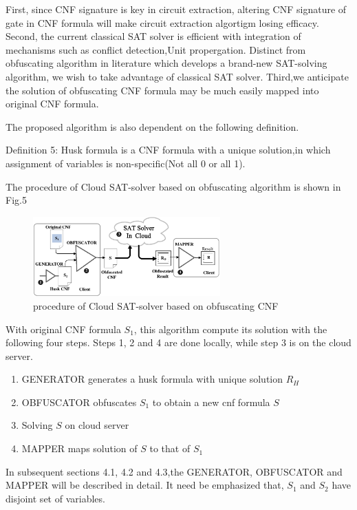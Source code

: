 \documentclass[runningheads,a4paper]{llncs}
\begin{document}
First, since CNF signature is key in circuit extraction, altering CNF signature of gate in CNF formula will make circuit extraction algortigm losing efficacy.
Second, the current classical SAT solver \cite{t10} is efficient with integration of mechanisms such as conflict detection,Unit propergation.
Distinct from obfuscating algorithm in literature\cite{t11} which develops a brand-new SAT-solving algorithm, we wish to take advantage of classical SAT solver.
Third,we anticipate the solution of obfuscating CNF formula may be much easily mapped into original CNF formula.

The proposed algorithm is also dependent on the following definition.

\noindent Definition 5: Husk formula is a CNF formula with a unique solution,in which assignment of variables is non-specific(Not all 0 or all 1).

The procedure of Cloud SAT-solver based on obfuscating algorithm is shown in Fig.5
\begin{figure}
\centering
\includegraphics[width=7.2cm]{a5}
\caption{procedure of Cloud SAT-solver based on obfuscating CNF}
\end{figure}

With original CNF formula $S_1$, 
this algorithm compute its solution with the following four steps. 
Steps 1, 2 and 4 are done locally,
while step 3 is on the cloud server.


\begin{enumerate}
 \item GENERATOR generates a husk formula with unique solution $R_H$ 
 \item OBFUSCATOR obfuscates $S_1$ to obtain a new cnf formula $S$
 \item Solving $S$ on cloud server
 \item MAPPER maps solution of $S$ to that of $S_1$ 
\end{enumerate}

In subsequent sections 4.1, 4.2 and 4.3,the GENERATOR, OBFUSCATOR and MAPPER will be described in detail. 
It need be emphasized that, $S_1$  and $S_2$ have disjoint set of variables.
\end{document}
